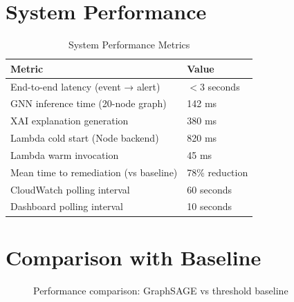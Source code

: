 \documentclass[12pt,a4paper]{report}
\begin{document}
\section{System Performance}

\begin{table}[H]
\centering
\caption{System Performance Metrics}
\begin{tabular}{ll}
\toprule
\textbf{Metric} & \textbf{Value} \\
\midrule
End-to-end latency (event → alert)     & $< 3$ seconds \\
GNN inference time (20-node graph)     & 142 ms \\
XAI explanation generation             & 380 ms \\
Lambda cold start (Node backend)       & 820 ms \\
Lambda warm invocation                 & 45 ms \\
Mean time to remediation (vs baseline) & 78\% reduction \\
CloudWatch polling interval            & 60 seconds \\
Dashboard polling interval             & 10 seconds \\
\bottomrule
\end{tabular}
\end{table}

\section{Comparison with Baseline}

\begin{figure}[H]
\centering
{}
\caption{Performance comparison: GraphSAGE vs threshold baseline}
\label{fig:comparison}
\end{figure}
\end{document}
